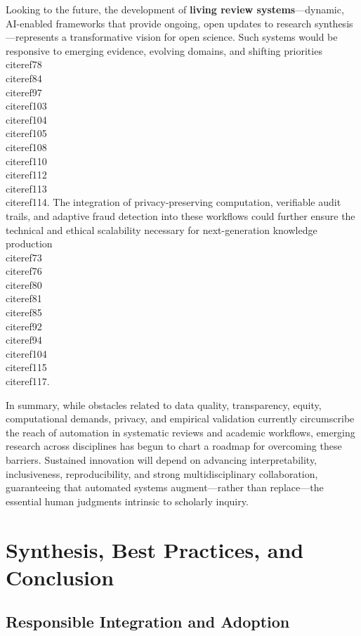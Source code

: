 \documentclass[11pt]{article}
\begin{document}
Looking to the future, the development of \textbf{living review systems}—dynamic, AI-enabled frameworks that provide ongoing, open updates to research synthesis—represents a transformative vision for open science. Such systems would be responsive to emerging evidence, evolving domains, and shifting priorities \\cite{ref78}\\cite{ref84}\\cite{ref97}\\cite{ref103}\\cite{ref104}\\cite{ref105}\\cite{ref108}\\cite{ref110}\\cite{ref112}\\cite{ref113}\\cite{ref114}. The integration of privacy-preserving computation, verifiable audit trails, and adaptive fraud detection into these workflows could further ensure the technical and ethical scalability necessary for next-generation knowledge production \\cite{ref73}\\cite{ref76}\\cite{ref80}\\cite{ref81}\\cite{ref85}\\cite{ref92}\\cite{ref94}\\cite{ref104}\\cite{ref115}\\cite{ref117}.

In summary, while obstacles related to data quality, transparency, equity, computational demands, privacy, and empirical validation currently circumscribe the reach of automation in systematic reviews and academic workflows, emerging research across disciplines has begun to chart a roadmap for overcoming these barriers. Sustained innovation will depend on advancing interpretability, inclusiveness, reproducibility, and strong multidisciplinary collaboration, guaranteeing that automated systems augment—rather than replace—the essential human judgments intrinsic to scholarly inquiry.

\section{Synthesis, Best Practices, and Conclusion}

\subsection{Responsible Integration and Adoption}
\end{document}
